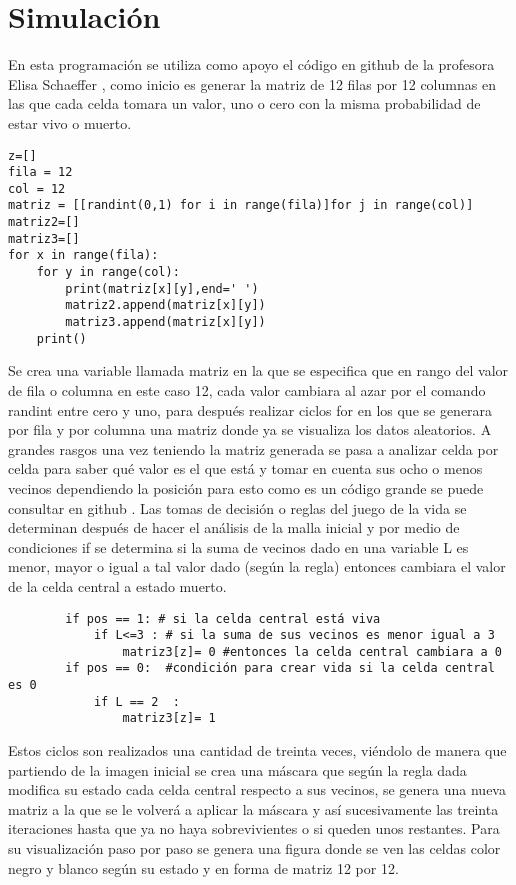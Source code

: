 \documentclass[a4paper, 11pt]{article}
\begin{document}
\section{Simulación}
En esta programación se utiliza como apoyo el código en github de la profesora Elisa Schaeffer \cite{dra}, como inicio es generar la matriz de 12 filas por 12 columnas en las que cada celda tomara un valor, uno o cero con la misma probabilidad de estar vivo o muerto. 
\begin{verbatim}
z=[]
fila = 12
col = 12
matriz = [[randint(0,1) for i in range(fila)]for j in range(col)]
matriz2=[]
matriz3=[]
for x in range(fila):
    for y in range(col):
        print(matriz[x][y],end=' ')
        matriz2.append(matriz[x][y])
        matriz3.append(matriz[x][y])        
    print()
\end{verbatim}
Se crea una variable llamada matriz en la que se especifica que en rango del valor de fila o columna en este caso 12, cada valor cambiara al azar por el comando randint entre cero y uno, para después realizar ciclos for en los que se generara por fila y por columna una matriz donde ya se visualiza los datos aleatorios.
A grandes rasgos una vez teniendo la matriz generada se pasa a analizar celda por celda para saber qué valor es el que está y tomar en cuenta sus ocho o menos vecinos dependiendo la posición para esto como es un código grande se puede consultar en github \cite{Edson}. Las tomas de decisión o reglas del juego de la vida se determinan después de hacer el análisis de la malla inicial y por medio de condiciones if se determina si la suma de vecinos dado en una variable L es menor, mayor o igual a tal valor dado (según la regla) entonces cambiara el valor de la celda central a estado muerto.
\begin{verbatim}
        if pos == 1: # si la celda central está viva 
            if L<=3 : # si la suma de sus vecinos es menor igual a 3
                matriz3[z]= 0 #entonces la celda central cambiara a 0
        if pos == 0:  #condición para crear vida si la celda central es 0 
            if L == 2  :  
                matriz3[z]= 1
\end{verbatim}
Estos ciclos son realizados una cantidad de treinta veces, viéndolo de manera que partiendo de la imagen inicial se crea una máscara que según la regla dada modifica su estado cada celda central respecto a sus vecinos, se genera una nueva matriz a la que se le volverá a aplicar la máscara y así sucesivamente las treinta iteraciones hasta que ya no haya sobrevivientes o si queden unos restantes. Para su visualización paso por paso se genera una figura donde se ven las celdas color negro y blanco según su estado y en forma de matriz 12 por 12.
\end{document}
